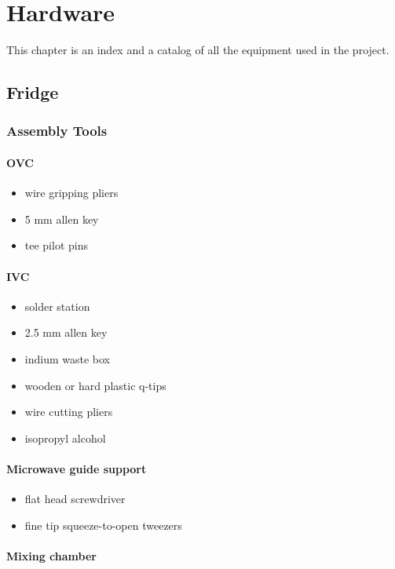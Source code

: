 \chapter{Hardware}
\label{hardware}
This chapter is an index and a catalog of all the equipment used in the project.
 
\section{Fridge}
  \subsection{Assembly Tools}
\subsubsection{OVC}

\begin{itemize}
  \item wire gripping pliers
  \item 5 mm allen key
  \item tee pilot pins  
\end{itemize}

\subsubsection{IVC}
\begin{itemize}
  \item solder station
  \item 2.5 mm allen key
  \item indium waste box
  \item wooden or hard plastic q-tips
  \item wire cutting pliers
  \item isopropyl alcohol 
\end{itemize}

\subsubsection{Microwave guide support}

\begin{itemize}
  \item flat head screwdriver
  \item fine tip squeeze-to-open tweezers 
\end{itemize}
 
\subsubsection{Mixing chamber}

